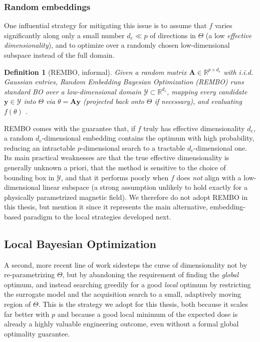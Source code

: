 \documentclass{article}
\newtheorem{defn}{Definition}
\begin{document}
	\subsubsection{Random embeddings}
	
	One influential strategy for mitigating this issue is to assume that $f$ varies significantly along only a small number $d_e \ll p$ of directions in $\Theta$ (a low \textit{effective dimensionality}), and to optimize over a randomly chosen low-dimensional subspace instead of the full domain.
	
	\begin{defn}[REMBO, informal]
		Given a random matrix $\mathbf{A} \in \mathbb{R}^{p \times d_e}$ with i.i.d. Gaussian entries, \textit{Random Embedding Bayesian Optimization} (REMBO) runs standard BO over a low-dimensional domain $\mathcal{Y} \subset \mathbb{R}^{d_e}$, mapping every candidate $\mathbf{y} \in \mathcal{Y}$ into $\Theta$ via $\theta = \mathbf{A}\mathbf{y}$ (projected back onto $\Theta$ if necessary), and evaluating $f(\theta)$ \cite{rembo}.
	\end{defn}
	
	REMBO comes with the guarantee that, if $f$ truly has effective dimensionality $d_e$, a random $d_e$-dimensional embedding contains the optimum with high probability, reducing an intractable $p$-dimensional search to a tractable $d_e$-dimensional one. Its main practical weaknesses are that the true effective dimensionality is generally unknown a priori, that the method is sensitive to the choice of bounding box in $\mathcal{Y}$, and that it performs poorly when $f$ does \textit{not} align with a low-dimensional linear subspace (a strong assumption unlikely to hold exactly for a physically parametrized magnetic field). We therefore do not adopt REMBO in this thesis, but mention it since it represents the main alternative, embedding-based paradigm to the local strategies developed next.
	
	\subsection{Local Bayesian Optimization}
	
	A second, more recent line of work sidesteps the curse of dimensionality not by re-parametrizing $\Theta$, but by abandoning the requirement of finding the \textit{global} optimum, and instead searching greedily for a good \textit{local} optimum by restricting the surrogate model and the acquisition search to a small, adaptively moving region of $\Theta$. This is the strategy we adopt for this thesis, both because it scales far better with $p$ and because a good local minimum of the expected dose is already a highly valuable engineering outcome, even without a formal global optimality guarantee.
	
\end{document}
